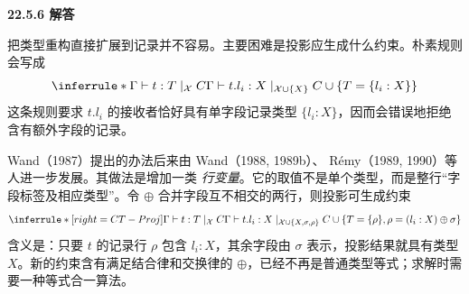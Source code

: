 \begin{taplauthorsolutionentrybox}
\label{sol:author:22.5.6}
\textbf{22.5.6 解答}

把类型重构直接扩展到记录并不容易。主要困难是投影应生成什么约束。朴素规则
会写成
\[
\inferrule*
 {\Gamma\vdash t:T\mid_{\mathcal X} C}
 {\Gamma\vdash t.l_i:X\mid_{\mathcal X\cup\{X\}}
  C\cup\{T=\{l_i:X\}\}}
\]
这条规则要求 \(t.l_i\) 的接收者恰好具有单字段记录类型
\(\{l_i:X\}\)，因而会错误地拒绝含有额外字段的记录。

Wand（1987）提出的办法后来由 Wand（1988, 1989b）、
Rémy（1989, 1990）等人进一步发展。其做法是增加一类
\emph{行变量}。它的取值不是单个类型，而是整行“字段标签及相应类型”。令
\(\oplus\) 合并字段互不相交的两行，则投影可生成约束
\[
\inferrule*[right=CT-Proj]
 {\Gamma\vdash t:T\mid_{\mathcal X}C}
 {\Gamma\vdash t.l_i:X\mid_{\mathcal X\cup\{X,\sigma,\rho\}}
  C\cup\{T=\{\rho\},\rho=(l_i:X)\oplus\sigma\}}
\]
含义是：只要 \(t\) 的记录行 \(\rho\) 包含 \(l_i:X\)，其余字段由 \(\sigma\)
表示，投影结果就具有类型 \(X\)。新的约束含有满足结合律和交换律的
\(\oplus\)，已经不再是普通类型等式；求解时需要一种等式合一算法。

\end{taplauthorsolutionentrybox}
